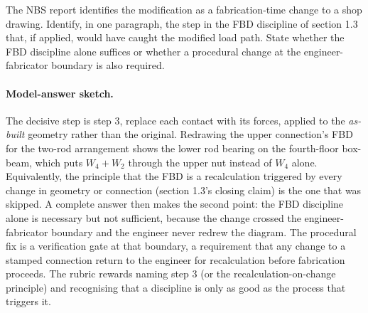 \begin{exercise}
The NBS report identifies the modification as a fabrication-time
change to a shop drawing. Identify, in one paragraph, the step in
the FBD discipline of section 1.3 that, if applied, would have
caught the modified load path. State whether the FBD discipline alone
suffices or whether a procedural change at the engineer-fabricator
boundary is also required.
\paragraph{Model-answer sketch.} The decisive step is step 3, replace
each contact with its forces, applied to the \emph{as-built} geometry
rather than the original. Redrawing the upper connection's FBD for the
two-rod arrangement shows the lower rod bearing on the fourth-floor
box-beam, which puts $W_4 + W_2$ through the upper nut instead of $W_4$
alone. Equivalently, the principle that the FBD is a recalculation
triggered by every change in geometry or connection (section 1.3's
closing claim) is the one that was skipped. A complete answer then makes
the second point: the FBD discipline alone is necessary but not
sufficient, because the change crossed the engineer-fabricator boundary
and the engineer never redrew the diagram. The procedural fix is a
verification gate at that boundary, a requirement that any change to a
stamped connection return to the engineer for recalculation before
fabrication proceeds. The rubric rewards naming step 3 (or the
recalculation-on-change principle) and recognising that a discipline is
only as good as the process that triggers it.
\end{exercise}

